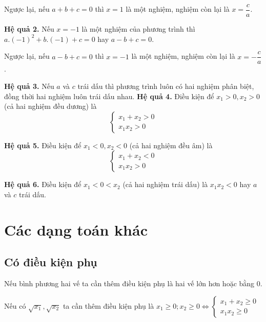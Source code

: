 \documentclass[12pt,a4paper]{extarticle}
\begin{document}
\vspace{0.5em}
\noindent Ngược lại, nếu $a + b + c = 0$ thì $x = 1$ là một nghiệm, nghiệm còn lại là $x = \dfrac{c}{a}$.

\vspace{0.8em}
\noindent\textbf{{Hệ quả 2.}} Nếu $x = -1$ là một nghiệm của phương trình thì \\
\indent $a.(-1)^2 + b.(-1) + c = 0$ hay $a - b + c = 0$.

\vspace{0.5em}
\noindent Ngược lại, nếu $a - b + c = 0$ thì $x = -1$ là một nghiệm, nghiệm còn lại là $x = -\dfrac{c}{a}$.

\vspace{0.8em}
\noindent\textbf{{Hệ quả 3.}} Nếu $a$ và $c$ trái dấu thì phương trình luôn có hai nghiệm phân biệt, đồng thời hai nghiệm luôn trái dấu nhau.
\noindent\textbf{{Hệ quả 4.}} Điều kiện để $x_1 > 0, x_2 > 0$ (cả hai nghiệm đều dương) là
\[\begin{cases} x_1 + x_2 > 0 \\ x_1x_2 > 0 \end{cases}\]

\noindent\textbf{{Hệ quả 5.}} Điều kiện để $x_1 < 0, x_2 < 0$ (cả hai nghiệm đều âm) là
\[\begin{cases} x_1 + x_2 < 0 \\ x_1x_2 > 0 \end{cases}\]

\noindent\textbf{{Hệ quả 6.}} Điều kiện để $x_1 < 0 < x_2$ (cả hai nghiệm trái dấu) là $x_1x_2 < 0$ hay $a$ và $c$ trái dấu.

\section{Các dạng toán khác}
\subsection{Có điều kiện phụ}
\vspace{0.5em}

\noindent Nếu bình phương hai vế ta cần thêm điều kiện phụ là hai vế lớn hơn hoặc bằng 0.

\vspace{0.8em}
\noindent Nếu có $\sqrt{x_1}, \sqrt{x_2}$ ta cần thêm điều kiện phụ là $x_1 \geq 0; x_2 \geq 0 \iff \begin{cases} x_1 + x_2 \geq 0 \\ x_1x_2 \geq 0 \end{cases}$
\end{document}
